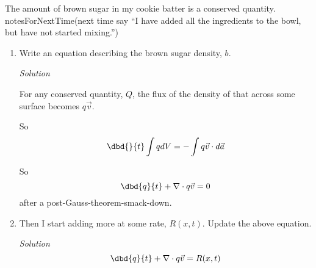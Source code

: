
 The amount of brown sugar in my cookie batter is a conserved quantity.
     notesForNextTime{(next time say ``I have added all the ingredients to the bowl, but have not started
    mixing.'')}
    \begin{enumerate}
        \item {} Write an equation describing the brown sugar density,
            $b$.

          \emph{Solution}
          
          For any conserved quantity, $Q$, the flux of the density of that
          across some surface becomes $q \vec{v}$.

          So $$\dbd{}{t}\int q dV = -\int q\vec{v}\cdot d\vec{a}\nn$$

          So $$\dbd{q}{t} + \nabla \cdot q \vec{v} = 0$$
          after a post-Gauss-theorem-smack-down.

      \item {} Then I start adding more at some rate, $R(x,t)$.  Update
          the above equation.

          \emph{Solution}
          $$\dbd{q}{t} + \nabla \cdot q \vec{v} = R(x,t)$$

  \end{enumerate}
